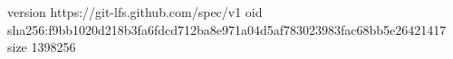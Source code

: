version https://git-lfs.github.com/spec/v1
oid sha256:f9bb1020d218b3fa6fdcd712ba8e971a04d5af783023983fac68bb5e26421417
size 1398256
